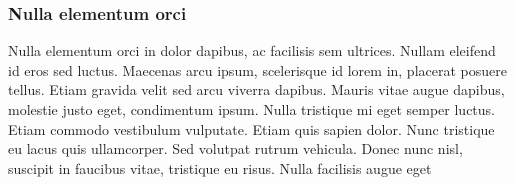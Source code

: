 \subsubsection{Nulla elementum orci}

Nulla elementum orci in dolor dapibus, ac facilisis sem ultrices. Nullam eleifend id eros sed luctus. Maecenas arcu ipsum, scelerisque id lorem in, placerat posuere tellus. Etiam gravida velit sed arcu viverra dapibus. Mauris vitae augue dapibus, molestie justo eget, condimentum ipsum. Nulla tristique mi eget semper luctus. Etiam commodo vestibulum vulputate. Etiam quis sapien dolor. Nunc tristique eu lacus quis ullamcorper. Sed volutpat rutrum vehicula. Donec nunc nisl, suscipit in faucibus vitae, tristique eu risus. Nulla facilisis augue eget